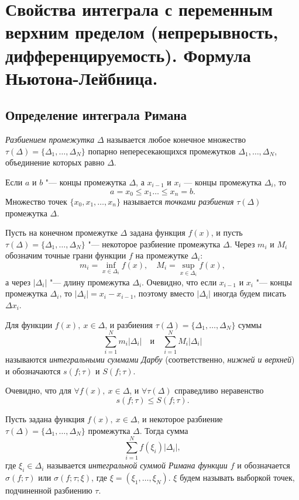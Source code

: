 \chapter[Свойства интеграла с переменным верхним пределом (непрерывность, дифференцируемость). Формула Ньютона-Лейбница.]{Свойства интеграла с переменным верхним пределом (непрерывность, дифференцируемость). Формула Ньютона-Лейбница.}
\section{Определение интеграла Римана}

\begin{defn}
\textit{Разбиением промежутка} $\Delta$ называется любое конечное множество $\tau(\Delta) = \{ \Delta_1, \ldots, \Delta_N\}$ попарно непересекающихся промежутков $\Delta_1, \ldots, \Delta_N$, объединение которых равно $\Delta$.

Если $a$ и $b$ "--- концы промежутка  $\Delta$, а $x_{i-1}$ и $x_{i}$ — концы промежутка $\Delta_i$, то
$$
a=x_0\le x_1\ldots \le x_n=b.
$$
Множество точек $\{x_0,x_1,\dots,x_n\}$ называется \textit{точками разбиения} $\tau(\Delta)$ промежутка $\Delta$.
\end{defn}

Пусть на конечном промежутке $\Delta$ задана функция $f(x)$, и пусть $\tau(\Delta) = \{ \Delta_1, \ldots, \Delta_N\}$ "--- некоторое разбиение промежутка $\Delta$. 
Через $m_i$ и $M_i$ обозначим точные грани функции $f$ на промежутке $\Delta_i$:
$$
m_i = \inf_{x \in \Delta_i} f(x), \quad M_i = \sup_{x \in \Delta_i} f(x),
$$ 
 а через $|\Delta_i|$ "--- длину промежутка $\Delta_i$. Очевидно, что если $x_{i-1}$ и $x_i$ "--- концы промежутка $\Delta_i$, то $|\Delta_i|=x_i-x_{i-1}$, поэтому вместо $|\Delta_i|$ иногда будем писать $\Delta x_i$. 

\begin{defn}
Для функции $f(x), \ x \in \Delta$, и разбиения $\tau(\Delta) = \{ \Delta_1, \ldots, \Delta_N\}$ суммы 
$$
\sum_{i = 1}^{N}m_i|\Delta_i| \quad \text{и} \quad \sum_{i = 1}^{N}M_i|\Delta_i|
$$
называются \textit{интегральными суммами Дарбу} (соответственно, \textit{нижней и верхней}) и обозначаются $s(f; \tau)$ и $S(f; \tau)$.
\end{defn}

Очевидно, что для $\forall f(x), \ x \in \Delta$, и $\forall \tau(\Delta)$ справедливо неравенство 
$$
s(f; \tau) \le S(f; \tau).
$$

\begin{defn}
Пусть задана функция $f(x), \ x \in \Delta$, и некоторое разбиение $\tau(\Delta) = \{ \Delta_1, \ldots, \Delta_N\}$ промежутка $\Delta$. Тогда сумма
$$
\sum_{i = 1}^{N} f(\xi_i)|\Delta_i|,
$$
где $\xi_i \in \Delta_i$ называется \textit{интегральной суммой Римана функции $f$} и обозначается $\sigma(f; \tau)$ или $\sigma(f; \tau; \xi)$, где $\xi = (\xi_1, \ldots, \xi_N)$. $\xi$ будем называть выборкой точек, подчиненной разбиению $\tau$.
\end{defn}

